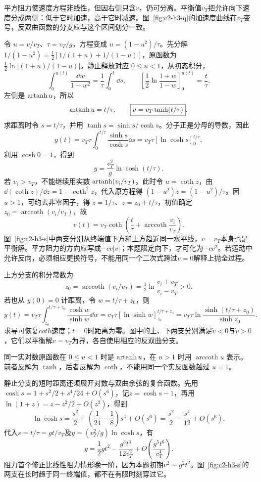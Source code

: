 \begin{solution}
平方阻力使速度方程非线性，但因右侧只含$v$，仍可分离。平衡值$v_T$把允许向下速度分成两侧：低于它时加速，高于它时减速。图~\ref{fig:c2-h3-q}的加速度曲线在$v_T$变号，反双曲函数的分支应与这个区间划分一致。


令 $u=v/v_T$、$\tau=v_T/g$，方程变成 $\dot u=(1-u^2)/\tau$。先分解 $1/(1-u^2)=\tfrac12[1/(1+u)+1/(1-u)]$，原函数为 $\tfrac12\ln|(1+u)/(1-u)|$。静止释放对应 $0\le u<1$，从初态积分，
\[
\int_0^{u(t)}\frac{\dd w}{1-w^2}=\frac1\tau\int_0^t\dd s,\qquad
\left[\frac12\ln\frac{1+w}{1-w}\right]_0^{u(t)}=\frac t\tau.
\]
左侧是 $\operatorname{artanh} u$，所以
\[\operatorname{artanh} u=t/\tau,\qquad \boxed{v=v_T\tanh(t/\tau)}.
\]
求距离时令 $s=t/\tau$，并用 $\tanh s=\sinh s/\cosh s$。分子正是分母的导数，因此
\[
y(t)=v_T\tau\int_0^{t/\tau}\frac{\sinh s}{\cosh s}\dd s
=v_T\tau[\ln\cosh s]_0^{t/\tau},
\]
利用 $\cosh0=1$，得到
\[\boxed{y=\frac{v_T^2}{g}\ln\cosh(t/\tau)}.
\]
若 $v_i>v_T$，不能继续用实数 $\operatorname{artanh}(v_i/v_T)$。此时令 $u=\coth z$，由 $\dd(\coth z)/\dd z=1-\coth^2z$，代入原方程得 $(1-u^2)\dot z=(1-u^2)/\tau$。因 $u>1$，可约去非零因子，得 $\dot z=1/\tau$、$z=z_0+t/\tau$，初值确定 $z_0=\operatorname{arccoth}(v_i/v_T)$，故
\[\boxed{v(t)=v_T\coth\left(\frac t\tau+\operatorname{arccoth}\frac{v_i}{v_T}\right)}.
\]
图~\ref{fig:c2-h3-s}中两支分别从终端值下方和上方趋近同一水平线，$v=v_T$本身也是平衡解。平方阻力的方向应写成$-cv|v|$；本题限定向下，才可化为$-cv^2$。若运动中允许反向，必须相应更换符号，不能用同一个二次式跨过$v=0$解释上抛全过程。


上方分支的积分常数为
\[z_0=\operatorname{arccoth}(v_i/v_T)
=\tfrac12\ln\frac{v_i+v_T}{v_i-v_T}>0.\]
若也从 $y(0)=0$ 计距离，令 $w=t/\tau+z_0$，则
\[
y(t)=v_T\tau\int_{z_0}^{t/\tau+z_0}\frac{\cosh w}{\sinh w}\dd w
=v_T\tau[\ln\sinh w]_{z_0}^{t/\tau+z_0}
=v_T\tau\ln\frac{\sinh(t/\tau+z_0)}{\sinh z_0}.
\]
求导可恢复$coth$速度；$t=0$时距离为零。图中的上、下两支分别满足$\dot v<0$与$\dot v>0$，它们以平衡解$v=v_T$为界，各自使用相应的反双曲分支。

同一实对数原函数在 $0\le u<1$ 时是 $\operatorname{artanh} u$，在 $u>1$ 时用 $\operatorname{arccoth}u$ 表示。前者反解为 $\tanh$，后者反解为 $\coth$，不能用同一个实反函数越过 $u=1$。

静止分支的短时距离还须展开对数与双曲余弦的复合函数。先用$\cosh s=1+s^2/2+s^4/24+O(s^6)$，记$z=\cosh s-1$，再用$\ln(1+z)=z-z^2/2+O(z^3)$，得到
\[
 \ln\cosh s=\frac{s^2}{2}
 +\left(\frac1{24}-\frac18\right)s^4+O(s^6)
 =\frac{s^2}{2}-\frac{s^4}{12}+O(s^6).
\]
代入$s=t/\tau=gt/v_T$及$y=(v_T^2/g)\ln\cosh s$，有
\[
 y=\frac12gt^2-\frac{g^3t^4}{12v_T^2}
 +O\!\left(\frac{g^5t^6}{v_T^4}\right).
\]
阻力首个修正比线性阻力情形晚一阶，因为本题初期$v^2\sim g^2t^2$。图~\ref{fig:c2-h3-s}的两支在长时趋于同一终端值，都不在有限时刻穿过它。


\end{solution}
